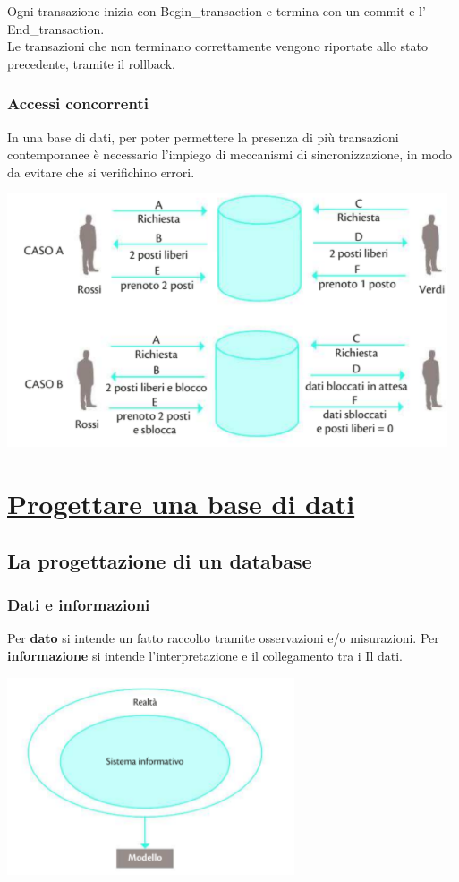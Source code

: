 \documentclass{article}
\begin{document}
Ogni transazione inizia con Begin\_transaction e termina con un commit e l'
End\_transaction.\\
Le transazioni che non terminano correttamente vengono riportate allo stato precedente, tramite il rollback.

\subsubsection{Accessi concorrenti}
In una base di dati, per poter permettere la presenza di più transazioni contemporanee è necessario l'impiego di meccanismi di sincronizzazione, in modo da evitare che si verifichino errori.
\\

\begin{center}

\includegraphics[scale=1.2]{acc.PNG}
    
\end{center}
\hline
\section{\underline{Progettare una base di dati}}
\subsection{La progettazione di un database}
\subsubsection{Dati e informazioni}
Per \textbf{dato} si intende un fatto raccolto tramite osservazioni e/o misurazioni.
Per \textbf{informazione} si intende l'interpretazione e il collegamento tra i Il dati.

\begin{center}
    \includegraphics[scale=1.1]{mod.PNG}
\end{center}
\end{document}
